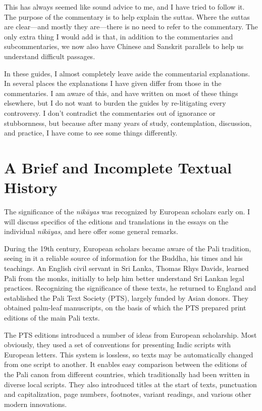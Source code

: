 \documentclass[12pt,openany]{book}%
\begin{document}
This has always seemed like sound advice to me, and I have tried to follow it. The purpose of the commentary is to help explain the suttas. Where the suttas are clear—and mostly they are—there is no need to refer to the commentary. The only extra thing I would add is that, in addition to the commentaries and subcommentaries, we now also have Chinese and Sanskrit parallels to help us understand difficult passages.

In these guides, I almost completely leave aside the commentarial explanations. In several places the explanations I have given differ from those in the commentaries. I am aware of this, and have written on most of these things elsewhere, but I do not want to burden the guides by re-litigating every controversy. I don’t contradict the commentaries out of ignorance or stubbornness, but because after many years of study, contemplation, discussion, and practice, I have come to see some things differently.

\section*{A Brief and Incomplete Textual History}

The significance of the \textit{\textsanskrit{nikāyas}} was recognized by European scholars early on. I will discuss specifics of the editions and translations in the essays on the individual \textit{\textsanskrit{nikāyas}}, and here offer some general remarks.

During the 19th century, European scholars became aware of the Pali tradition, seeing in it a reliable source of information for the Buddha, his times and his teachings. An English civil servant in Sri Lanka, Thomas Rhys Davids, learned Pali from the monks, initially to help him better understand Sri Lankan legal practices. Recognizing the significance of these texts, he returned to England and established the Pali Text Society (PTS), largely funded by Asian donors. They obtained palm-leaf manuscripts, on the basis of which the PTS prepared print editions of the main Pali texts.

The PTS editions introduced a number of ideas from European scholarship. Most obviously, they used a set of conventions for presenting Indic scripts with European letters. This system is lossless, so texts may be automatically changed from one script to another. It enables easy comparison between the editions of the Pali canon from different countries, which traditionally had been written in diverse local scripts. They also introduced titles at the start of texts, punctuation and capitalization, page numbers, footnotes, variant readings, and various other modern innovations.
\end{document}
